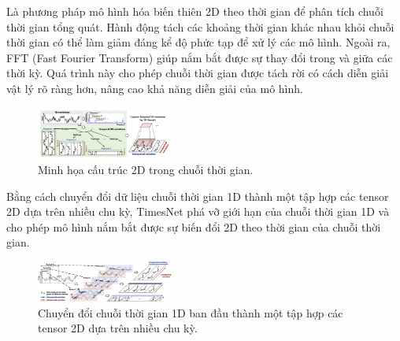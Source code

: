 Là phương pháp mô hình hóa biến thiên 2D theo thời gian để phân tích chuỗi thời gian tổng quát. Hành động tách các khoảng thời gian khác nhau khỏi chuỗi thời gian có thể làm giảm đáng kể độ phức tạp để xử lý các mô hình. Ngoài ra, FFT (Fast Fourier Transform) giúp nắm bắt được sự thay đổi trong và giữa các thời kỳ. Quá trình này cho phép chuỗi thời gian được tách rời có cách diễn giải vật lý rõ ràng hơn, nâng cao khả năng diễn giải của mô hình.

\begin{figure}[htbp]
\centerline{\includegraphics[width=0.4\textwidth]{img/2Dstructure.png}}
\caption{Minh họa cấu trúc 2D trong chuỗi thời gian.}
\label{fig}
\end{figure}

Bằng cách chuyển đổi dữ liệu chuỗi thời gian 1D thành một tập hợp các tensor 2D dựa trên nhiều chu kỳ, TimesNet phá vỡ giới hạn của chuỗi thời gian 1D và cho phép mô hình nắm bắt được sự biến đổi 2D theo thời gian của chuỗi thời gian.

\begin{figure}[htbp]
\centerline{\includegraphics[width=0.4\textwidth]{img/2Dtensor.png}}
\caption{Chuyển đổi chuỗi thời gian 1D ban đầu thành một tập hợp các tensor 2D dựa trên nhiều chu kỳ.}
\label{fig}
\end{figure}